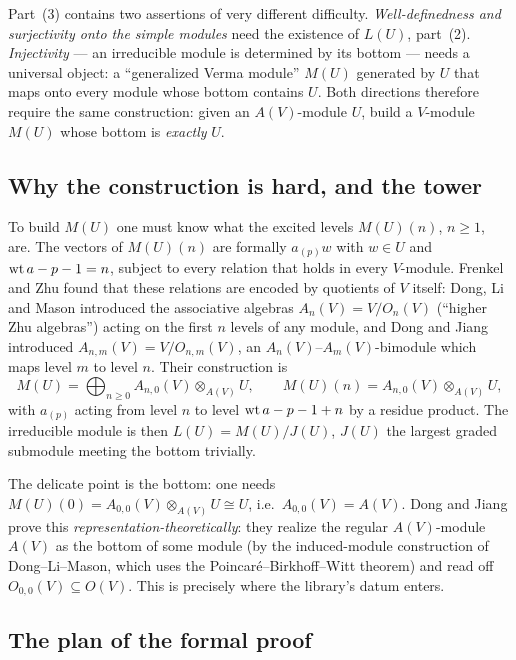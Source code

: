Part~(3) contains two assertions of very different difficulty. \emph{Well-definedness and surjectivity onto the simple
modules} need the existence of $L(U)$, part~(2). \emph{Injectivity} --- an irreducible module is determined by its
bottom --- needs a universal object: a ``generalized Verma module'' $M(U)$ generated by $U$ that maps onto every module
whose bottom contains $U$. Both directions therefore require the same construction: given an $A(V)$-module $U$, build a
$V$-module $M(U)$ whose bottom is \emph{exactly} $U$.

\subsection{Why the construction is hard, and the tower}

To build $M(U)$ one must know what the excited levels $M(U)(n)$, $n\ge1$, are. The vectors of $M(U)(n)$ are formally
$a_{(p)}w$ with $w\in U$ and $\operatorname{wt} a - p - 1 = n$, subject to every relation that holds in every $V$-module. Frenkel and
Zhu found that these relations are encoded by quotients of $V$ itself: Dong, Li and Mason introduced the associative
algebras $A_n(V) = V/O_n(V)$ (``higher Zhu algebras'') acting on the first $n$ levels of any module, and Dong and Jiang
introduced $A_{n,m}(V) = V/O_{n,m}(V)$, an $A_n(V)$--$A_m(V)$-bimodule which maps level $m$ to level $n$. Their
construction is
\begin{equation}\label{l13:eq:MU}
 M(U) = \bigoplus_{n\ge0} A_{n,0}(V)\otimes_{A(V)}U,\qquad M(U)(n) = A_{n,0}(V)\otimes_{A(V)}U,
\end{equation}
with $a_{(p)}$ acting from level $n$ to level $\operatorname{wt} a-p-1+n$ by a residue product. The irreducible module is then
$L(U) = M(U)/J(U)$, $J(U)$ the largest graded submodule meeting the bottom trivially.

The delicate point is the bottom: one needs $M(U)(0) = A_{0,0}(V)\otimes_{A(V)}U\cong U$, i.e.\ $A_{0,0}(V) = A(V)$.
Dong and Jiang prove this \emph{representation-theoretically}: they realize the regular $A(V)$-module $A(V)$ as the
bottom of some module (by the induced-module construction of Dong--Li--Mason, which uses the
Poincar\'e--Birkhoff--Witt theorem) and read off $O_{0,0}(V)\subseteq O(V)$. This is precisely where the library's
datum  enters.

\subsection{The plan of the formal proof}

